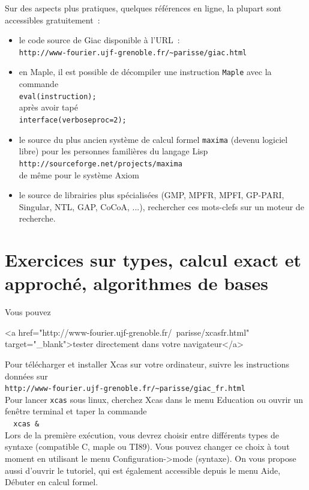 \documentclass[a4paper,11pt]{book}
\begin{document}
\begin{giacjshere}
Sur des aspects plus pratiques, quelques r\'ef\'erences en ligne, 
la plupart sont accessibles  gratuitement~:
\begin{itemize}
\item le code source de Giac disponible à l'URL~:\\
\verb|http://www-fourier.ujf-grenoble.fr/~parisse/giac.html|
\item en Maple, il est possible de
décompiler une instruction \verb|Maple| avec la commande\\
\verb|eval(instruction);|\\
après avoir tapé\\
\verb|interface(verboseproc=2);|
\item le source du plus ancien système de calcul formel \verb|maxima|
(devenu logiciel libre) pour les personnes famili\`eres du langage Lisp\\
\verb|http://sourceforge.net/projects/maxima|\\
de m\^eme pour le syst\`eme Axiom
\item le source de librairies plus spécialisées (GMP, MPFR, MPFI, GP-PARI, Singular,
NTL, GAP, CoCoA, ...), rechercher ces mots-clefs sur un moteur de recherche.
\end{itemize}

\pagebreak

\section{Exercices  sur types, calcul exact et approch\'e, 
algorithmes  de  bases} \label{sec:exos_algobase}
Vous pouvez 
\begin{rawhtml}
<a href="http://www-fourier.ujf-grenoble.fr/~parisse/xcasfr.html" target="_blank">tester directement dans votre navigateur</a>
\end{rawhtml}
Pour t\'el\'echarger et installer Xcas sur votre ordinateur, suivre
les instructions donn\'ees sur\\
\verb|http://www-fourier.ujf-grenoble.fr/~parisse/giac_fr.html|\\
Pour lancer {\tt xcas} sous linux, cherchez Xcas dans le menu
Education ou ouvrir un fen\^etre terminal et
taper la commande\\
\verb|  xcas & |\\
Lors de la premi\`ere ex\'ecution, vous devrez choisir entre
diff\'erents types de syntaxe (compatible C, maple ou TI89). Vous
pouvez changer ce choix \`a tout moment en utilisant le menu
Configuration->mode (syntaxe). On vous propose aussi d'ouvrir le
tutoriel, qui est \'egalement accessible depuis le menu Aide,
D\'ebuter en calcul formel.


\end{giacjshere}
\end{document}

